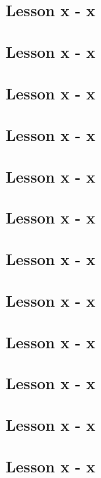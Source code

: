 \subsection{Lesson x - x}

\subsection{Lesson x - x}

\subsection{Lesson x - x}

\subsection{Lesson x - x}

\subsection{Lesson x - x}

\subsection{Lesson x - x}

\subsection{Lesson x - x}

\subsection{Lesson x - x}

\subsection{Lesson x - x}

\subsection{Lesson x - x}

\subsection{Lesson x - x}

\subsection{Lesson x - x}

